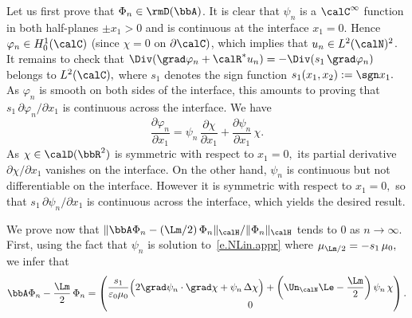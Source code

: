 \begin{proofc}
\begin{step}\label{proofprop3.6.1}
Let us first prove that $\Phi_n \in \rmD(\bbA)$. It is clear that $\psi_n$ is a $\calC^\infty$ function in both half-planes $\pm x_1 > 0$ and is continuous at the interface $x_1 = 0.$ Hence $\varphi_n \in H_0^1(\calC)$ (since $\chi=0$ on $\partial \calC)$, which implies that $u_n \in L^2(\calN)^2$. It remains to check that $\Div(\grad \varphi_n + \calR^* u_n) = - \Div (s_1 \, \grad \varphi_n)$ belongs to $L^2(\calC),$ where $s_1$ denotes the sign function $s_1(x_1,x_2) := \sgn x_1.$ As $\varphi_n$ is smooth on both sides of the interface, this amounts to proving that $s_1 \, \partial \varphi_n/\partial x_1$ is continuous across the interface. We have
\[
\frac{\partial \varphi_n}{\partial x_1} = \psi_n \,\frac{\partial \chi}{\partial x_1} + \frac{\partial \psi_n}{\partial x_1}\,\chi.
\]
As $\chi \in \calD(\bbR^2)$ is symmetric with respect to $x_1=0,$ its partial derivative $\partial \chi/\partial x_1$ vanishes on the interface. On the other hand, $\psi_n$ is continuous but not differentiable on the interface. However it is symmetric with respect to $x_1=0,$ so that $s_1 \, \partial \psi_n/\partial x_1$ is continuous across the interface, which yields the desired result.
\end{step}

\begin{step}\label{proofprop3.6.2}
We prove now that $\|\bbA \Phi_n - (\Lm/2)\,\Phi_n\|_\calH/\|\Phi_n\|_\calH$ tends to $0$ as $n \to \infty$. First, using the fact that $\psi_n$ is solution to~\eqref{e.NLin.appr} where $\mu_{\Lm/2} = -s_1\,\mu_0,$ we infer that
\[
\bbA \Phi_n - \frac{\Lm}{2}\, \Phi_n =
\begin{pmatrix}
\displaystyle\frac{s_1}{\varepsilon_0 \mu_0}
\Big(2 \grad\psi_n \cdot \grad\chi + \psi_n\,\Delta \chi \Big) + \left(\Un_\calN \Le - \frac{\Lm}{2} \right) \psi_n\,\chi \\
0
\end{pmatrix}.
\]


\end{step}
\end{proofc}
